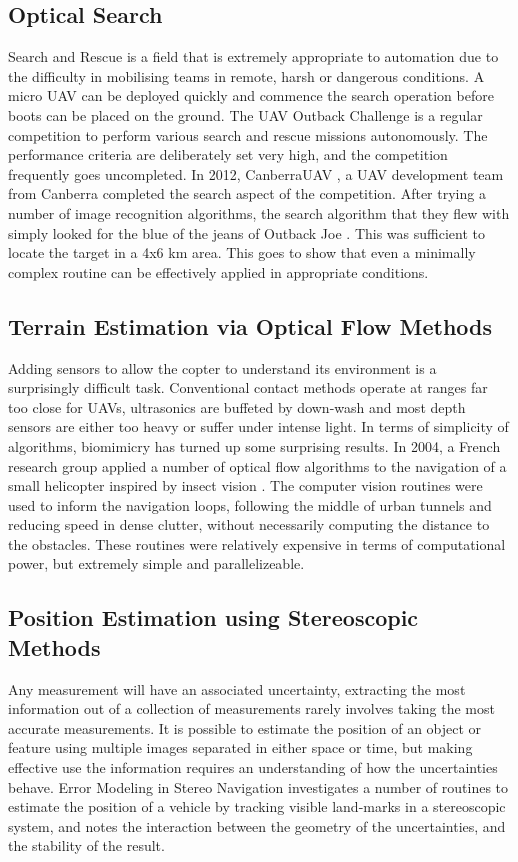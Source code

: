 \documentclass[a4paper, 11pt, titlepage]{article}
\begin{document}
    \subsection{Optical Search}
      Search and Rescue is a field that is extremely appropriate to automation due to the difficulty in mobilising teams in remote, harsh or dangerous conditions.  A micro UAV can be deployed quickly and commence the search operation before boots can be placed on the ground.
      The UAV Outback Challenge \cite{OutbackChallenge} is a regular competition to perform various search and rescue missions autonomously.  The performance criteria are deliberately set very high, and the competition frequently goes uncompleted.  
      In 2012, CanberraUAV \cite{canberrauav}, a UAV development team from Canberra completed the search aspect of the competition.
      After trying a number of image recognition algorithms, the search algorithm that they flew with simply looked for the blue of the jeans of Outback Joe \cite{tridge}. This was sufficient to locate the target in a 4x6 km area.  This goes to show that even a minimally complex routine can be effectively applied in appropriate conditions.

    \subsection{Terrain Estimation via Optical Flow Methods}
      Adding sensors to allow the copter to understand its environment is a surprisingly difficult task.  Conventional contact methods operate at ranges far too close for UAVs, ultrasonics are buffeted by down-wash and most depth sensors are either too heavy or suffer under intense light.
      In terms of simplicity of algorithms, biomimicry has turned up some surprising results.  In 2004, a French research group applied a number of optical flow algorithms to the navigation of a small helicopter inspired by insect vision \cite{InsectFlowMethods}.  The computer vision routines were used to inform the navigation loops, following the middle of urban tunnels and reducing speed in dense clutter, without necessarily computing the distance to the obstacles.  These routines were relatively expensive in terms of computational power, but extremely simple and parallelizeable.

    \subsection{Position Estimation using Stereoscopic Methods}
      Any measurement will have an associated uncertainty, extracting the most information out of a collection of measurements rarely involves taking the most accurate measurements.  It is possible to estimate the position of an object or feature using multiple images separated in either space or time, but making effective use the information requires an understanding of how the uncertainties behave.  Error Modeling in Stereo Navigation \cite{stereoUnc} investigates a number of routines to estimate the position of a vehicle by tracking visible land-marks in a stereoscopic system, and notes the interaction between the geometry of the uncertainties, and the stability of the result.
\end{document}
